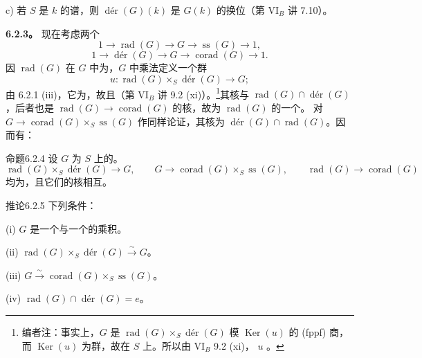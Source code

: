c) 若 $S$ 是 $k$ 的谱，则 $\operatorname{d\text{é}r}(G)(k)$ 是 $G(k)$ 的换位（第 VI$_B$ 讲 7.10）。

\textbf{6.2.3。} 现在考虑两个
\[1\longrightarrow\operatorname{rad}(G)\longrightarrow G\longrightarrow\operatorname{ss}(G)\longrightarrow1,\]
\[1\longrightarrow\operatorname{d\text{é}r}(G)\longrightarrow G\longrightarrow\operatorname{corad}(G)\longrightarrow1.\]
因 $\operatorname{rad}(G)$ 在 $G$ 中为，$G$ 中乘法定义一个群
\[u:\operatorname{rad}(G)\times_S\operatorname{d\text{é}r}(G)\longrightarrow G;\]
由 6.2.1 (iii)，它为，故且（第 VI$_B$ 讲 9.2 (xi)）。\footnote{编者注：事实上，$G$ 是 $\operatorname{rad}(G)\times_S\operatorname{d\text{é}r}(G)$ 模 $\operatorname{Ker}(u)$ 的 (fppf) 商，而 $\operatorname{Ker}(u)$ 为群，故在 $S$ 上。所以由 VI$_B$ 9.2 (xi)， $u$ 。}其核与 $\operatorname{rad}(G)\cap\operatorname{d\text{é}r}(G)$ ，后者也是 $\operatorname{rad}(G)\to\operatorname{corad}(G)$ 的核，故为 $\operatorname{rad}(G)$ 的一个。
对 $G\to\operatorname{corad}(G)\times_S\operatorname{ss}(G)$ 作同样论证，其核为 $\operatorname{d\text{é}r}(G)\cap\operatorname{rad}(G)$。因而有：
\begin{SGAresult}{命题}{6.2.4}
设 $G$ 为 $S$ 上的。
\[\operatorname{rad}(G)\times_S\operatorname{d\text{é}r}(G)\longrightarrow G,\qquad
G\longrightarrow\operatorname{corad}(G)\times_S\operatorname{ss}(G),\qquad
\operatorname{rad}(G)\longrightarrow\operatorname{corad}(G)\]
均为，且它们的核相互。
\end{SGAresult}
\begin{SGAresult}{推论}{6.2.5}
下列条件：

(i) $G$ 是一个与一个的乘积。

(ii) $\operatorname{rad}(G)\times_S\operatorname{d\text{é}r}(G)\xrightarrow\sim G$。

(iii) $G\xrightarrow\sim\operatorname{corad}(G)\times_S\operatorname{ss}(G)$。

(iv) $\operatorname{rad}(G)\cap\operatorname{d\text{é}r}(G)=e$。
\end{SGAresult}
